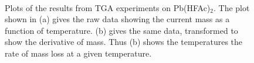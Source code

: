 \begin{figure}[htbp]
   \centering
    \\
   \caption[TGA Results for Pb(HFAc)$_{2}$ Precursor]%
   		{Plots of the results from TGA experiments on Pb(HFAc)$_{2}$. The plot shown in (a) gives the raw %
		data showing the current mass as a function of temperature. (b) gives the same data, transformed %
		to show the derivative of mass. Thus (b) shows the temperatures the rate of mass loss at a given %
		temperature.}
   \label{fig:TGA-HFAc}
\end{figure}

